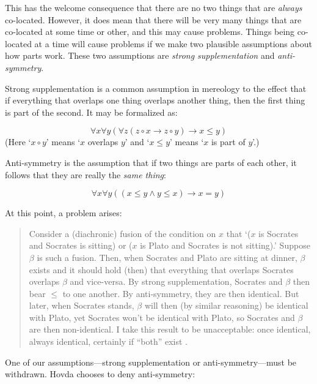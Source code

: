 \documentclass[12pt,twoside]{reedfancy}
\begin{document}
\begin{spacing}{1.25}
This has the welcome consequence that there are no two things that are
{\em always} co-located.  However, it does mean that there will be
very many things that are co-located at some time or other, and this
may cause problems.  Things being co-located at a time will cause
problems if we make two plausible assumptions about how parts work.
These two assumptions are {\em strong supplementation} and {\em
  anti-symmetry}.

Strong supplementation is a common assumption in mereology to the
effect that if everything that overlaps one thing overlaps another
thing, then the first thing is part of the second.  It may be
formalized as:

\begin{displaymath}
\forall x \forall y ( \forall z ( z \circ x \rightarrow z \circ y )
\rightarrow x \leq y )
\end{displaymath}
(Here `$x \circ y$' means `$x$ overlaps $y$' and `$x \leq y$' means
`$x$ is part of $y$'.)

Anti-symmetry is the assumption that if two things are parts of each
other, it follows that they are really the {\em same thing}:

\begin{displaymath}
\forall x \forall y ( ( x \leq y \wedge y \leq x ) \rightarrow x = y )
\end{displaymath}

At this point, a problem arises:

\begin{quote}
Consider a (diachronic) fusion of the condition on $x$ that `($x$ is
Socrates and Socrates is sitting) or ($x$ is Plato and Socrates is not
sitting).'  Suppose $\beta$ is such a fusion.  Then, when Socrates and
Plato are sitting at dinner, $\beta$ exists and it should hold (then)
that everything that overlaps Socrates overlaps $\beta$ and
vice-versa.  By strong supplementation, Socrates and $\beta$ then bear
$\leq$ to one another.  By anti-symmetry, they are then identical.
But later, when Socrates stands, $\beta$ will then (by similar
reasoning) be identical with Plato, yet Socrates won't be identical
with Plato, so Socrates and $\beta$ are then non-identical.  I take
this result to be unacceptable: once identical, always identical,
certainly if ``both'' exist \citeyearpar[sec. 3.1.2]{hovda2011}.
\end{quote}

One of our assumptions---strong supplementation or
anti-symmetry---must be withdrawn.  Hovda chooses to deny
anti-symmetry:


\end{spacing}
\end{document}

